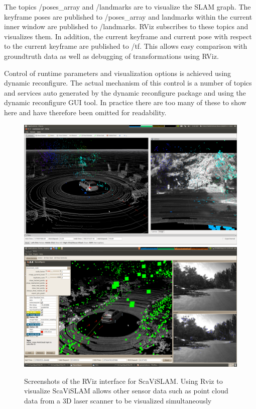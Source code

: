 The topics /poses\_array and /landmarks are to visualize the SLAM graph.  The keyframe poses are published to /poses\_array and landmarks within the current inner window are published to /landmarks.  RViz subscribes to these topics and visualizes them.  In addition, the current keyframe and current pose with respect to the current keyframe are published to /tf.  This allows easy comparison with groundtruth data as well as debugging of transformations using RViz.

Control of runtime parameters and visualization options is achieved using dynamic reconfigure.  The actual mechanism of this control is a number of topics and services auto generated by the dynamic reconfigure package and using the dynamic reconfigure GUI tool.  In practice there are too many of these to show here and have therefore been omitted for readability.

\begin{figure}[h]
  \centering
    \includegraphics[width=1.0\textwidth, trim=10em 15em 1em 15em, clip=true]{chapters/images/rviz} \\ \vspace{0.5em}
    \includegraphics[width=1.0\textwidth, trim=39em 10em 1em 15em, clip=true]{chapters/images/rviz-2}
  \caption{Screenshots of the RViz interface for ScaViSLAM.  Using Rviz to visualize ScaViSLAM allows other sensor data such as point cloud data from a 3D laser scanner to be visualized simultaneously}
  \label{fig:rviz}
\end{figure}